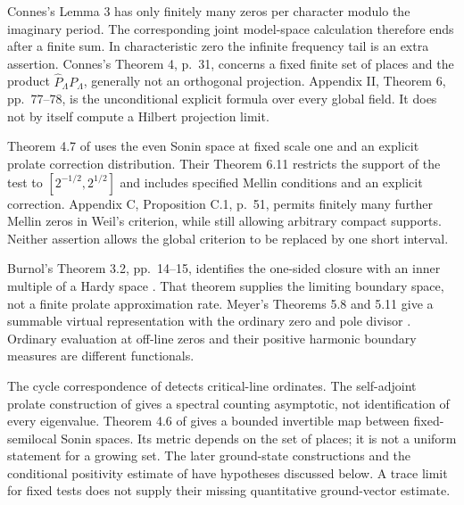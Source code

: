 \begin{description}[style=nextline,leftmargin=1em,font=\normalfont\bfseries]
\item[Positive characteristic and the semilocal formula.]
Connes's Lemma 3 has only finitely many zeros per character modulo
the imaginary period. The corresponding joint model-space
calculation therefore ends after a finite sum. In characteristic
zero the infinite frequency tail is an extra assertion.
Connes's Theorem 4, p.~31, concerns a fixed finite set of places
and the product $\widehat P_\Lambda P_\Lambda$, generally not an
orthogonal projection. Appendix II, Theorem 6, pp.~77--78, is the
unconditional explicit formula over every global field. It does
not by itself compute a Hilbert projection limit.

\item[The archimedean Sonin identity.]
Theorem 4.7 of \citet{cc2020} uses the even Sonin space at fixed
scale one and an explicit prolate correction distribution. Their
Theorem 6.11 restricts the support of the test to
$[2^{-1/2},2^{1/2}]$ and includes specified Mellin conditions and
an explicit correction. Appendix C, Proposition C.1, p.~51,
permits finitely many further Mellin zeros in Weil's criterion,
while still allowing arbitrary compact supports. Neither assertion
allows the global criterion to be replaced by one short interval.

\item[Hardy closure and nuclear realizations.]
Burnol's Theorem 3.2, pp.~14--15, identifies the one-sided closure
with an inner multiple of a Hardy space \citep{burnol2000}.
That theorem supplies the limiting boundary space, not a finite
prolate approximation rate. Meyer's Theorems 5.8 and 5.11 give a
summable virtual representation with the ordinary zero and pole
divisor \citep{meyer2005}. Ordinary evaluation at off-line zeros
and their positive harmonic boundary measures are different
functionals.

\item[The subsequent prolate and semilocal constructions.]
The cycle correspondence of \citet[Theorems~1.1 and 6.4,
pp.~4, 52--53]{cc2021} detects critical-line ordinates.
The self-adjoint prolate construction of
\citet[Theorems~2.6 and 6.1, pp.~7, 13]{cm2021} gives a spectral
counting asymptotic, not identification of every eigenvalue.
Theorem 4.6 of \citet[p.~23]{ccm2023} gives a bounded invertible
map between fixed-semilocal Sonin spaces. Its metric depends on
the set of places; it is not a uniform statement for a growing
set. The later ground-state constructions
\citep[Theorem~5.10, p.~23]{ccm2025} and the conditional
positivity estimate of \citet[Theorem~8.14, p.~47]{acl2026}
have hypotheses discussed below. A trace limit for fixed tests
does not supply their missing quantitative ground-vector estimate.


\end{description}
